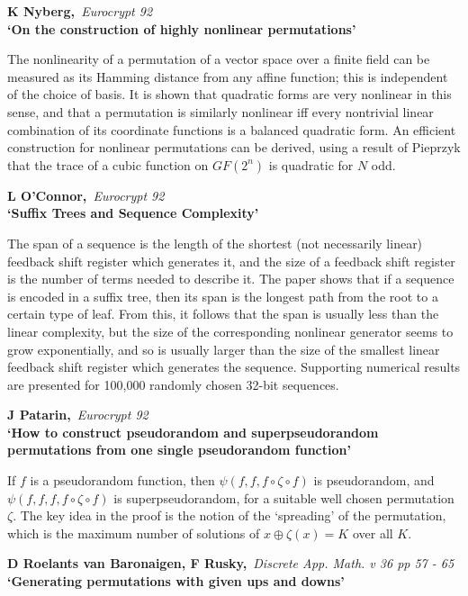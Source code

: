 \pagebreak

{\bf \noindent K Nyberg,}{\em ~Eurocrypt 92\\}
{\bf `On the construction of highly nonlinear permutations'}

The nonlinearity of a permutation of a vector space over a finite field
can be measured as its Hamming distance from any affine function; this is
independent of the choice of basis. It is shown that quadratic forms are
very nonlinear in this sense, and that a permutation is similarly nonlinear 
iff every nontrivial linear combination of its coordinate functions is a
balanced quadratic form. An efficient construction for nonlinear permutations
can be derived, using a result of Pieprzyk that the trace of a cubic function 
on $GF(2^n)$ is quadratic for $N$ odd.

{\bf \noindent L O'Connor,}{\em ~Eurocrypt 92\\}
{\bf `Suffix Trees and Sequence Complexity'}

The span of a sequence is the length of the shortest (not necessarily linear) 
feedback shift register which generates it, and the size of a feedback shift
register is the number of terms needed to describe it. The paper shows that 
if a sequence is encoded in a suffix tree, then its span is the longest path 
from the root to a certain type of leaf. From this, it follows that the span 
is usually less than the linear complexity, but the size of the corresponding
nonlinear generator seems to grow exponentially, and so is usually larger than 
the size of the smallest linear feedback shift register which generates the 
sequence. Supporting numerical results are presented for 100,000 randomly 
chosen 32-bit sequences.

{\bf \noindent J Patarin,}{\em ~Eurocrypt 92\\}
{\bf `How to construct pseudorandom and superpseudorandom permutations from
one single pseudorandom function'}

If $f$ is a pseudorandom function, then $\psi(f,f,f \circ \zeta \circ f)$
is pseudorandom, and  $\psi(f,f,f,f \circ \zeta \circ f)$ is superpseudorandom,
for a suitable well chosen permutation $\zeta$. The key idea in the proof is
the notion of the `spreading' of the permutation, which is the maximum
number of solutions of $x \oplus \zeta(x) = K$ over all $K$.

{\bf \noindent D Roelants van Baronaigen, F Rusky,}{\em ~Discrete App. Math.
v 36 pp 57 - 65\\}
{\bf `Generating permutations with given ups and downs'}

